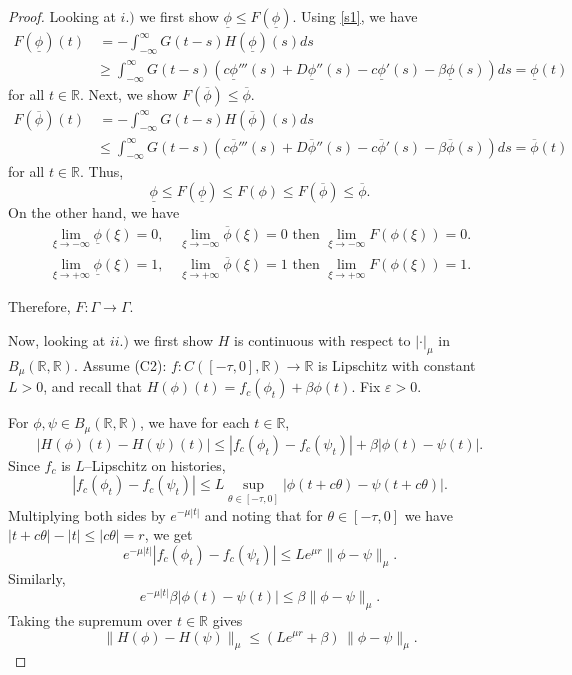 \documentclass[12pt,letterpaper]{amsart}
\def\R{\mathbb R}
\theoremstyle{definition}
\theoremstyle{remark}
\numberwithin{equation}{section}
\begin{document}
 \begin{proof}
 	Looking at $i.)$ we first show $ \underline{\phi}\le F(\underline{\phi})$. Using \eqref{s1}, we have
 	\begin{align*}
 		 F(\underline{\phi})(t)&\,=-\int_{-\infty}^{\infty} G(t-s)H (\underline{\phi})(s) ds\\
 		&\ge \int_{-\infty}^{\infty} G(t-s)\left(c\underline{\phi}'''(s)+D\underline{\phi}''(s)-c\underline{\phi}'(s)-\beta \underline{\phi}(s)\right) ds=\underline{\phi}(t)
 	\end{align*}
 	for all $t\in \R.$
 	Next, we show $F(\overline{\phi})   \le\overline{\phi}$.
 	\begin{align*}
 		F(\overline{\phi}) (t)&\,=-\int_{-\infty}^{\infty} G(t-s)H (\overline{\phi})(s) ds\\
 		&\le \int_{-\infty}^{\infty} G(t-s)\left(c\overline{\phi}'''(s)+D\overline{\phi}''(s)-c\overline{\phi}'(s)-\beta\overline{\phi}(s)\right) ds=\overline{\phi}(t)
 	\end{align*}
 	for all $t\in \R.$  
	Thus, $$\underline{\phi} \le F(\underline{\phi}) \le F(\phi) \le F(\overline{\phi})   \le \overline{\phi}.$$
 	On the other hand, we have  
 		\begin{align*}
 			\lim_{\xi \to -\infty} \underline{\phi}(\xi) = 0, \quad 
 	\lim_{\xi \to -\infty} \overline{\phi}(\xi) = 0 \text{ then } \lim_{\xi \to -\infty} F( \phi (\xi)) = 0.
 	\\
 		\lim_{\xi \to +\infty} \underline{\phi}(\xi) = 1, \quad 
 	\lim_{\xi \to +\infty} \overline{\phi}(\xi) = 1 \text{ then } \lim_{\xi \to +\infty} F( \phi (\xi)) = 1.
 	 	\end{align*}
 	 
 	Therefore,  	 $F:\Gamma\to \Gamma.$
 	
 	Now, looking at $ii.)$ we first show $H$ is continuous with respect to  $|\cdot|_{\mu}$ in $B_{\mu}(\R,\R).$ 
 	Assume (C2): $f:C([-\tau,0],\mathbb R)\to\mathbb R$ is Lipschitz with constant $L>0$,
 	and recall that $H(\phi)(t)=f_c(\phi_t)+\beta\phi(t)$.
 	Fix $\varepsilon>0$. 
 	
 	For $\phi,\psi\in B_\mu(\mathbb R,\mathbb R)$, we have for each $t\in\mathbb R$,
 	\[
 	|H(\phi)(t)-H(\psi)(t)|
 	\le |f_c(\phi_t)-f_c(\psi_t)| + \beta|\phi(t)-\psi(t)|.
 	\]
 	Since $f_c$ is $L$–Lipschitz on histories,
 	\[
 	|f_c(\phi_t)-f_c(\psi_t)|
 	\le L\sup_{\theta\in[-\tau,0]}|\phi(t+c\theta)-\psi(t+c\theta)|.
 	\]
 	Multiplying both sides by $e^{-\mu|t|}$ and noting that 
 	for $\theta\in[-\tau,0]$ we have $|t+c\theta|-|t|\le |c\theta|=r$, we get
 	\[
 	e^{-\mu|t|}|f_c(\phi_t)-f_c(\psi_t)|
 	\le L e^{\mu r}\|\phi-\psi\|_\mu.
 	\]
 	Similarly,
 	\[
 	e^{-\mu|t|}\beta|\phi(t)-\psi(t)| \le \beta\|\phi-\psi\|_\mu.
 	\]
 	Taking the supremum over $t\in\mathbb R$ gives
 \begin{equation} \label{h est}
 	\|H(\phi)-H(\psi)\|_\mu
 \le (L e^{\mu r} + \beta)\,\|\phi-\psi\|_\mu.
 \end{equation}
 

\end{proof}
\end{document}
